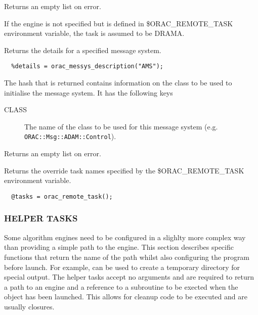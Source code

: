 Returns an empty list on error.



If the engine is not specified but is defined in \$ORAC\_REMOTE\_TASK
environment variable, the task is assumed to be DRAMA.


\item[\textbf{orac\_messys\_description}] \mbox{}

Returns the details for a specified message system.

\begin{verbatim}
  %details = orac_messys_description("AMS");
\end{verbatim}


The hash that is returned contains information on the
class to be used to initialise the message system.
It has the following keys

\begin{description}

\item[CLASS] \mbox{}

The name of the class to be used for this message system
(e.g. \texttt{ORAC::Msg::ADAM::Control}).

\end{description}


Returns an empty list on error.



Returns the override task names specified by the \$ORAC\_REMOTE\_TASK
environment variable.

\begin{verbatim}
  @tasks = orac_remote_task();
\end{verbatim}
\subsubsection*{HELPER TASKS\label{ORAC::Inst::Defn_HELPER_TASKS}}


Some algorithm engines need to be configured in a slighlty more complex
way than providing a simple path to the engine. This section
describes specific functions that return the name of the path whilst
also configuring the program before launch. For example, can be used
to create a temporary directory for special output. The helper tasks
accept no arguments and are required to return a path to an
engine and a reference to a subroutine to be exected when the
object has been launched. This allows for cleanup code to be executed
and are usually closures.

